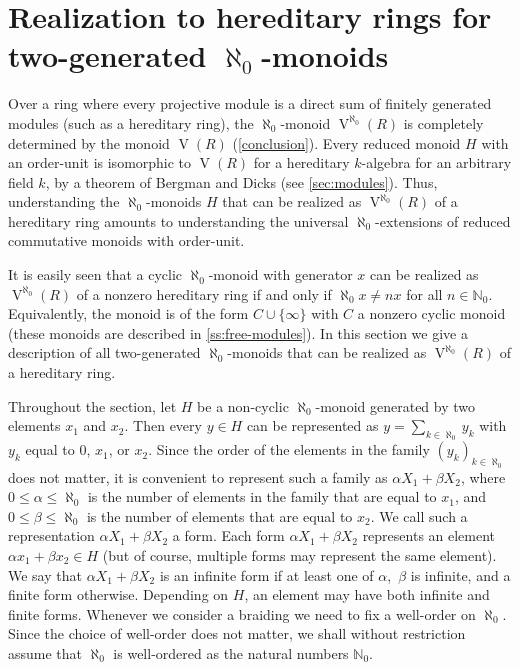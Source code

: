 \documentclass[a4paper,11pt,oneside]{amsart}
\theoremstyle{remark}
\newcommand{\defit}[1]{\textsf{#1}}
\newcommand{\bN}{\mathbb N}
\DeclareMathOperator{\Vmon}{V}
\begin{document}
\section{Realization to hereditary rings for two-generated \texorpdfstring{$\aleph_0$}{ℵ₀}-monoids} \label{sec:twogen}

Over a ring where every projective module is a direct sum of finitely generated modules (such as a hereditary ring), the $\aleph_0$-monoid $\Vmon^{\aleph_0}(R)$ is completely determined by the monoid $\Vmon(R)$ (\cref{conclusion}).
Every reduced monoid $H$ with an order-unit is isomorphic to $\Vmon(R)$ for a hereditary $k$-algebra for an arbitrary field $k$, by a theorem of Bergman and Dicks (see \cref{sec:modules}).
Thus, understanding the $\aleph_0$-monoids $H$ that can be realized as $\Vmon^{\aleph_0}(R)$ of a hereditary ring amounts to understanding the universal $\aleph_0$-extensions of reduced commutative monoids with order-unit.


It is easily seen that a cyclic $\aleph_0$-monoid with generator $x$ can be realized as $\Vmon^{\aleph_0}(R)$ of a nonzero hereditary ring if and only if $\aleph_0 x \ne n x$ for all $n \in \bN_0$.
Equivalently, the monoid is of the form $C \cup \{\infty\}$ with $C$ a nonzero cyclic monoid (these monoids are described in \cref{ss:free-modules}).
In this section we give a description of all two-generated $\aleph_0$-monoids that can be realized as $\Vmon^{\aleph_0}(R)$ of a hereditary ring.

Throughout the section, let $H$ be a non-cyclic $\aleph_0$-monoid generated by two elements $x_1$ and $x_2$.
Then every $y \in H$ can be represented as $y = \sum_{k \in \aleph_0} y_k$ with $y_k$ equal to $0$, $x_1$, or $x_2$.
Since the order of the elements in the family $(y_k)_{k \in \aleph_0}$ does not matter, it is convenient to represent such a family as $\alpha X_1 + \beta X_2$, where $0 \le \alpha \le \aleph_0$ is the number of elements in the family that are equal to $x_1$, and $0 \le \beta \le \aleph_0$ is the number of elements that are equal to $x_2$.
We call such a representation $\alpha X_1 + \beta X_2$ a \defit{form}.
Each form $\alpha X_1 + \beta X_2$ represents an element $\alpha x_1 + \beta x_2 \in H$ (but of course, multiple forms may represent the same element).
We say that $\alpha X_1 + \beta X_2$ is an \defit{infinite form} if at least one of $\alpha$,~$\beta$ is infinite, and a \defit{finite form} otherwise.
Depending on $H$, an element may have both infinite and finite forms.
Whenever we consider a braiding we need to fix a well-order on $\aleph_0$. 
Since the choice of well-order does not matter, we shall without restriction assume that $\aleph_0$ is well-ordered as the natural numbers $\bN_0$.
\end{document}
